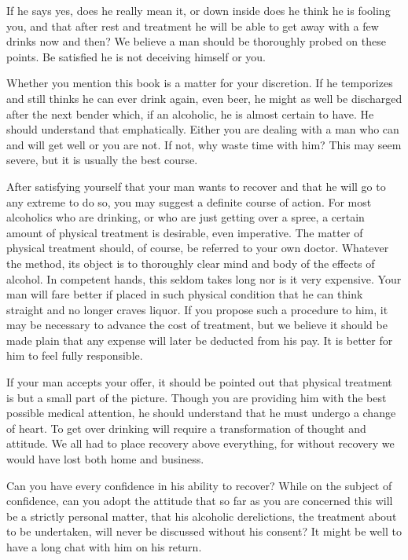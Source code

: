 \begin{biblechapter}
If he says yes, does he really mean it, or down inside does he think he is fooling you, and that after rest and treatment he will be able to get away with a few drinks now and then?  We believe a man should be thoroughly probed on these points.  Be satisfied he is not deceiving himself or you.

Whether you mention this book is a matter for your discretion.  If he temporizes and still thinks he can ever drink again, even beer, he might as well be discharged after the next bender which, if an alcoholic, he is almost certain to have.  He should understand that emphatically.  Either you are dealing with a man who can and will get well or you are not.  If not, why waste time with him?  This may seem severe, but it is usually the best course.

After satisfying yourself that your man wants to recover and that he will go to any extreme to do so, you may suggest a definite course of action.  For most alcoholics who are drinking, or who are just getting over a spree, a certain amount of physical treatment is desirable, even imperative.  The matter of physical treatment should, of course, be referred to your own doctor.  Whatever the method, its object is to thoroughly clear mind and body of the effects of alcohol.  In competent hands, this seldom takes long nor is it very expensive.  Your man will fare better if placed in such physical condition that he can think straight and no longer craves liquor.  If you propose such a procedure to him, it may be necessary to advance the cost of treatment, but we believe it should be made plain that any expense will later be deducted from his pay.  It is better for him to feel fully responsible.

If your man accepts your offer, it should be pointed out that physical treatment is but a small part of the picture.  Though you are providing him with the best possible medical attention, he should understand that he must undergo a change of heart.  To get over drinking will require a transformation of thought and attitude.  We all had to place recovery above everything, for without recovery we would have lost both home and business.

Can you have every confidence in his ability to recover?  While on the subject of confidence, can you adopt the attitude that so far as you are concerned this will be a strictly personal matter, that his alcoholic derelictions, the treatment about to be undertaken, will never be discussed without his consent?  It might be well to have a long chat with him on his return.


\end{biblechapter}
